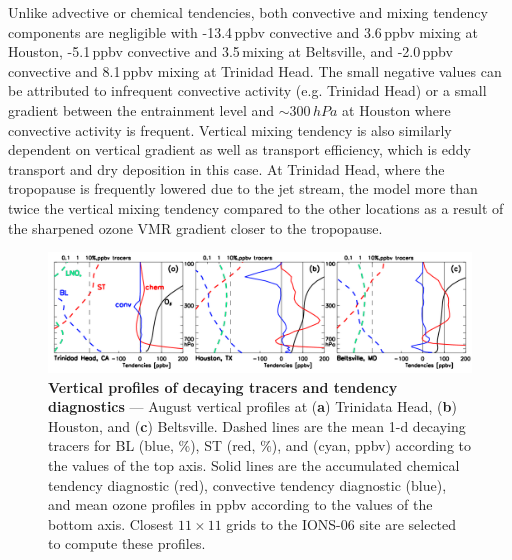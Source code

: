 Unlike advective or chemical tendencies, both convective and mixing tendency components are negligible with -13.4\,\unit{ppbv} convective
and 3.6\,\unit{ppbv} mixing at Houston, -5.1\,\unit{ppbv} convective and 3.5\,\unit{mixing} at Beltsville, and -2.0\,\unit{ppbv} convective and
8.1\,\unit{ppbv} mixing at Trinidad Head. The small negative values can be attributed to infrequent convective activity (e.g. Trinidad Head)
or a small gradient between the entrainment level and $\sim300\,\unit{hPa}$ at Houston where convective activity is frequent.
Vertical mixing tendency is also similarly dependent on vertical gradient as well as transport efficiency, which is eddy transport and
dry deposition in this case. At Trinidad Head, where the tropopause is frequently lowered due to the jet stream, the model more than twice
the vertical mixing tendency compared to the other locations as a result of the sharpened ozone VMR gradient closer to the tropopause.

	\begin{figure}[t!]
		\centering
		\includegraphics[width=1.0\textwidth]{tendency/vertical.png}
		\caption[Vertical profiles of decaying tracers and tendency diagnostics]{\textbf{Vertical profiles of decaying tracers
		and tendency diagnostics} --- \label{fig:2006/tendency_vertical} August vertical profiles at ({\bf a}) Trinidata Head, ({\bf b}) Houston,
		and ({\bf c}) Beltsville. Dashed lines are the mean 1-d decaying tracers for BL (blue, \unit{\%}), ST (red, \unit{\%}), and {\lnox} (cyan,
		\unit{ppbv}) according to the values of the top axis. Solid lines are the accumulated chemical tendency diagnostic (red), convective
		tendency diagnostic (blue), and mean ozone profiles in \unit{ppbv} according to the values of the bottom axis. Closest $11\times11$
		grids to the IONS-06 site are selected to compute these profiles.}\vspace{-.3in}
	\end{figure}

